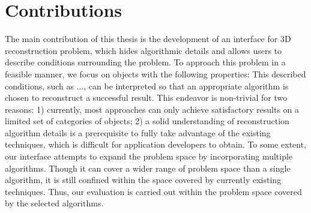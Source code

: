 \section{Contributions}
The main contribution of this thesis is the development of an interface for 3D reconstruction problem, which hides algorithmic details and allows users to describe conditions surrounding the problem. To approach this problem in a feasible manner, we focus on objects with the following properties: This described conditions, such as ..., can be interpreted so that an appropriate algorithm is chosen to reconstruct a successful result. This endeavor is non-trivial for two reasons: 1) currently, most approaches can only achieve satisfactory results on a limited set of categories of objects; 2) a solid understanding of reconstruction algorithm details is a prerequisite to fully take advantage of the existing techniques, which is difficult for application developers to obtain. To some extent, our interface attempts to expand the problem space by incorporating multiple algorithms. Though it can cover a wider range of problem space than a single algorithm, it is still confined within the space covered by currently existing techniques. Thus, our evaluation is carried out within the problem space covered by the selected algorithms.



